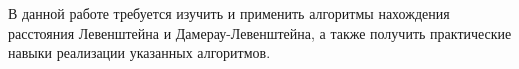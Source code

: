 \Introduction
    В данной работе требуется изучить и применить алгоритмы нахождения 
    расстояния Левенштейна и Дамерау-Левенштейна, а также получить
    практические навыки реализации указанных алгоритмов.
\newpage